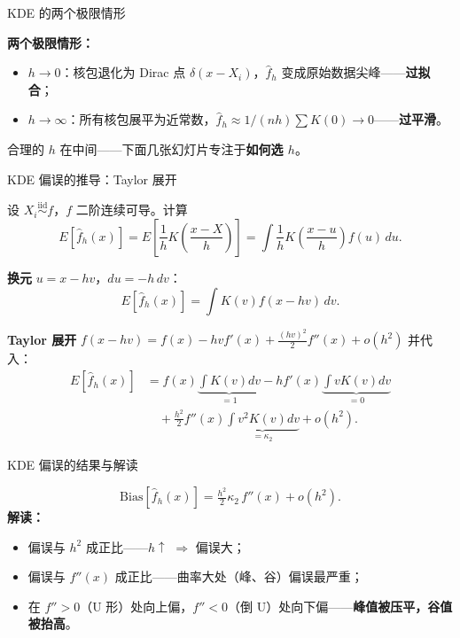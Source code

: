 \documentclass[aspectratio=169, 10pt]{beamer}
\begin{document}
\begin{frame}{KDE 的两个极限情形}

  \begin{keybox}
    \textbf{两个极限情形：}
    \begin{itemize}
      \item $h\to 0$：核包退化为 Dirac 点 $\delta(x-X_i)$，$\hat f_h$ 变成原始数据尖峰——\textbf{过拟合}；
      \item $h\to \infty$：所有核包展平为近常数，$\hat f_h \approx 1/(nh)\sum K(0) \to 0$——\textbf{过平滑}。
    \end{itemize}
    合理的 $h$ 在中间——下面几张幻灯片专注于\textbf{如何选 $h$}。
  \end{keybox}

\end{frame}


\begin{frame}{KDE 偏误的推导：Taylor 展开}

  设 $X_i \overset{\text{iid}}{\sim} f$，$f$ 二阶连续可导。计算
  \[
    E[\hat f_h(x)] = E\!\left[\frac{1}{h}K\!\left(\frac{x-X}{h}\right)\right]
    = \int \frac{1}{h}K\!\left(\frac{x-u}{h}\right) f(u)\, du.
  \]

  \textbf{换元} $u = x - hv$，$du = -h\,dv$：
  \[
    E[\hat f_h(x)] = \int K(v) f(x - hv)\, dv.
  \]

  \textbf{Taylor 展开} $f(x-hv) = f(x) - hv f'(x) + \tfrac{(hv)^2}{2}f''(x) + o(h^2)$ 并代入：
  \begin{align*}
    E[\hat f_h(x)]
    &= f(x)\underbrace{\int K(v)dv}_{=1} - hf'(x)\underbrace{\int vK(v)dv}_{=0} \\
    &\quad + \tfrac{h^2}{2}f''(x)\underbrace{\int v^2 K(v)dv}_{=\kappa_2} + o(h^2).
  \end{align*}

\end{frame}


\begin{frame}{KDE 偏误的结果与解读}

  \begin{highlightbox}
    \[
      \boxed{\;\text{Bias}[\hat f_h(x)] = \tfrac{h^2}{2}\kappa_2\, f''(x) + o(h^2).\;}
    \]
    \textbf{解读：}
    \begin{itemize}
      \item 偏误与 $h^2$ 成正比——$h\uparrow$ $\Rightarrow$ 偏误大；
      \item 偏误与 $f''(x)$ 成正比——曲率大处（峰、谷）偏误最严重；
      \item 在 $f''>0$（U 形）处向上偏，$f''<0$（倒 U）处向下偏——\textbf{峰值被压平，谷值被抬高}。
    \end{itemize}
  \end{highlightbox}
  \hypertarget{main-b3}{}\hfill{\scriptsize\hyperlink{proof-b3}{}}

\end{frame}
\end{document}
